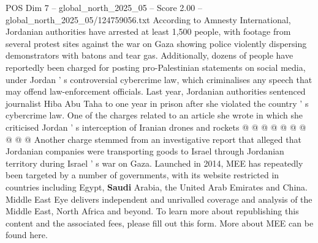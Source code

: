\begin{textsample}{POS Dim 7 – global\_north\_2025\_05 – Score 2.00 – global\_north\_2025\_05/124759056.txt}
According to Amnesty International, Jordanian authorities have arrested at least 1,500 people, with footage from several protest sites against the war on Gaza showing police violently dispersing demonstrators with batons and tear gas.
Additionally, dozens of people have reportedly been charged for posting pro-Palestinian statements on social media, under Jordan ' s controversial cybercrime law, which criminalises any speech that may offend law-enforcement officials.
Last year, Jordanian authorities sentenced journalist Hiba Abu Taha to one year in prison after she violated the country ' s cybercrime law.
One of the charges related to an article she wrote in which she criticised Jordan ' s interception of Iranian drones and rockets @ @ @ @ @ @ @ @ @ @ Another charge stemmed from an investigative report that alleged that Jordanian companies were transporting goods to Israel through Jordanian territory during Israel ' s war on Gaza.
Launched in 2014, MEE has repeatedly been targeted by a number of governments, with its website restricted in countries including Egypt, \textbf{Saudi} Arabia, the United Arab Emirates and China.
Middle East Eye delivers independent and unrivalled coverage and analysis of the Middle East, North Africa and beyond.
To learn more about republishing this content and the associated fees, please fill out this form.
More about MEE can be found here.

\end{textsample}
